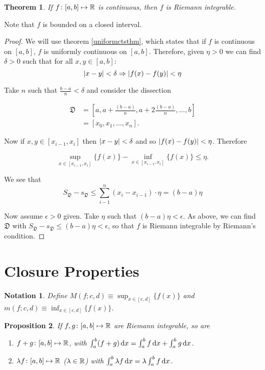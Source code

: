\documentclass{notes}
\theoremstyle{plain}
\newtheorem{proposition}{Proposition}[chapter]
\newtheorem{theorem}[proposition]{Theorem}
\newtheorem*{notation}{Notation}
\newcommand{\dis}{\mathfrak{D}}
\begin{document}
\begin{theorem}
If $ f\colon [a,b] \mapsto \mathbb{R} $ is continuous, then $ f $
is Riemann integrable.
\end{theorem}

Note that $ f $ is bounded on a closed interval.

\begin{proof}
We will use theorem \ref{uniformctsthm}, which states
that if $ f $ is continuous on $ [a,b] $, $ f $ 
is uniformly continuous on $ [a,b] $.
Therefore, given $ \eta>0 $ we can find $ \delta>0 $ such that for all $ 
x,y \in [a,b] $:
\[ \left|x-y\right|< \delta \Rightarrow \left|f(x)-f(y)\right|<\eta \]

Take $ n $ such that $\frac{b-a}{n}< \delta$
and consider the dissection

\begin{align*}
\dis & =  \left[a,a+ \frac{(b-a)}{n}, a + 2 \frac{(b-a)}{n},
\ldots, b\right] \\
& = [x_{0},x_{1},\ldots,x_{n}].
\end{align*}

Now if $ x,y\in [x_{i-1},x_{i}] $ then $ \left|x-y\right|< \delta $ and 
so $\left|f(x)-f(y)\right|< \eta$.  Therefore

\[
\sup_{x \in [x_{i-1},x_{i}]}\{f(x)\} - \inf_{x \in 
[x_{i-1},x_{i}]}\{f(x)\} \leq \eta.
\]

We see that
\[ S_{\dis}-s_{\dis} \leq \sum_{i-1}^{n}(x_{i}-x_{i-1})\cdot\eta = 
(b-a)\eta \]

Now assume $ \epsilon>0 $ given. Take $ \eta $ such that
$(b-a)\eta < \epsilon$.
As above, we can find $ \dis $ with
$S_{\dis}-s_{\dis} \leq (b-a)\eta < \epsilon$,
so that $ f $ is Riemann integrable by Riemann's condition.
\end{proof}

\section{Closure Properties}

\begin{notation}
Define
$M(f;c,d) \equiv \sup_{x \in [c,d]}\{f(x)\}$ and
$m(f;c,d) \equiv \inf_{x \in [c,d]}\{f(x)\}$.
\end{notation}

\begin{proposition}
If $ f,g\colon [a,b]\mapsto \mathbb{R} $ are Riemann integrable, so are
\begin{enumerate}
\item $ f+g\colon [a,b] \mapsto \mathbb{R} $, with
$\int_{a}^{b}(f+g)\,\mathrm{d} x= \int_{a}^{b}f \,\mathrm{d} x + \int_{a}^{b}g \,\mathrm{d} x$.

\item $ \lambda f\colon [a,b] \mapsto \mathbb{R} $ ($ \lambda \in \mathbb{R} $) with
$\int_{a}^{b}\lambda f \,\mathrm{d} x = \lambda \int_{a}^{b}f \,\mathrm{d} x$.
\end{enumerate}
\end{proposition}
\end{document}
